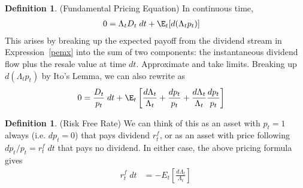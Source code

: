 \documentclass[12pt]{article}
\theoremstyle{plain}
\theoremstyle{definition}
\newtheorem{defn}[thm]{Definition}
\theoremstyle{remark}
\begin{document}
\begin{defn}(Fundamental Pricing Equation)
In continuous time,
\begin{align*}
  0 &= \Lambda_t D_t\;dt + \E_t[d(\Lambda_t p_t)]
\end{align*}
This arises by breaking up the expected payoff from the dividend stream
in Expression~\ref{pemx} into the sum of two components: the
instantaneous dividend flow plus the resale value at time $dt$.
Approximate and take limits.
Breaking up $d(\Lambda_t p_t)$ by Ito's Lemma, we can also rewrite as
\begin{align*}
  0 &= \frac{D_t}{p_t}\;dt +
  \E_t\left[
    \frac{d\Lambda_t}{\Lambda_t}
    +
    \frac{dp_t}{p_t}
    +
    \frac{d\Lambda_t}{\Lambda_t}
    \frac{dp_t}{p_t}
  \right]
\end{align*}
\end{defn}

\begin{defn}(Risk Free Rate)
We can think of this as an asset with $p_t=1$ always (i.e. $dp_t=0$)
that pays dividend $r^f_t$, or as an asset with price following
$dp_t/p_t=r^f_t\;dt$ that pays no dividend. In either case, the above
pricing formula gives
\begin{align*}
  r_t^f\;dt
  &=
  -
  E_t\left[
    \frac{d\Lambda_t}{\Lambda_t}
  \right]
\end{align*}
\end{defn}
\end{document}
